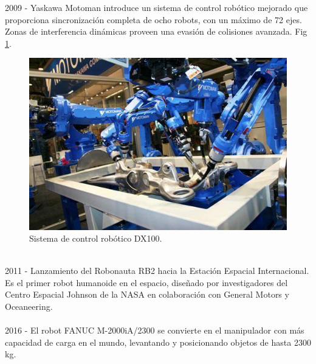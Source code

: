 2009 - Yaskawa Motoman introduce un sistema de control robótico mejorado que proporciona sincronización completa de ocho robots, con un máximo de 72 ejes. Zonas de interferencia dinámicas proveen una evasión de colisiones avanzada. Fig \ref{yaskawa}.\\
\begin{figure}
	\centering
	\includegraphics[scale=0.7]{Capitulo1/figs/Yaskawa.jpg} 
	\caption{Sistema de control robótico DX100.}
	\label{yaskawa}
\end{figure}\\
2011 - Lanzamiento del Robonauta RB2 hacia la Estación Espacial Internacional. Es el primer robot humanoide en el espacio, diseñado por investigadores del Centro Espacial Johnson de la NASA en colaboración con General Motors y Oceaneering.\\\\
2016 - El robot FANUC M-2000iA/2300 se convierte en el manipulador con más capacidad de carga en el mundo, levantando y posicionando objetos de hasta 2300 kg.\\\\

